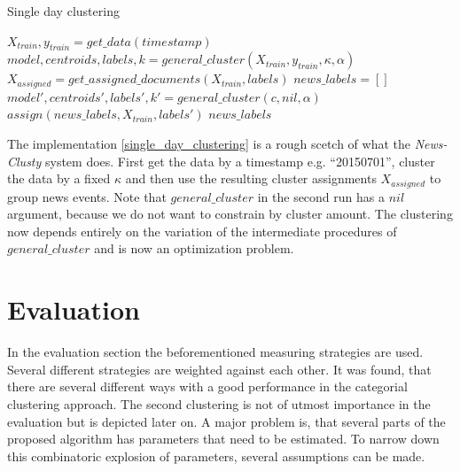  \begin{algorithm}[H]
  \begin{algorithmic}[1]
    \caption{Single day clustering}\label{single_day_clustering}
      \State $X_{train},y_{train} = get\_data(timestamp)$
      \State $model,centroids,labels,k = general\_cluster(X_{train},y_{train},\kappa,\alpha)$
      \State $X_{assigned} = get\_assigned\_documents(X_{train},labels)$
      \State $news\_labels = []$
        \State $model',centroids',labels',k' = general\_cluster(c,nil,\alpha)$
        \State $assign(news\_labels, X_{train}, labels')$
      \EndFor
      \State \Return $news\_labels$
  \end{algorithmic}
  \end{algorithm}

The implementation \ref{single_day_clustering} is a rough scetch of what the \emph{News-Clusty} system does. First get the data by a timestamp e.g. ``20150701'', cluster the data by a fixed $\kappa$ and then use the resulting cluster assignments $X_{assigned}$ to group news events. Note that $general\_cluster$ in the second run has a $nil$ argument, because we do not want to constrain by cluster amount. The clustering now depends entirely on the variation of the intermediate procedures of $general\_cluster$ and is now an optimization problem. 

\section{Evaluation}
In the evaluation section the beforementioned measuring strategies are used. Several different strategies are weighted against each other. It was found, that there are several different ways with a good performance in the categorial clustering approach. The second clustering is not of utmost importance in the evaluation but is depicted later on. A major problem is, that several parts of the proposed algorithm has parameters that need to be estimated. To narrow down this combinatoric explosion of parameters, several assumptions can be made.

